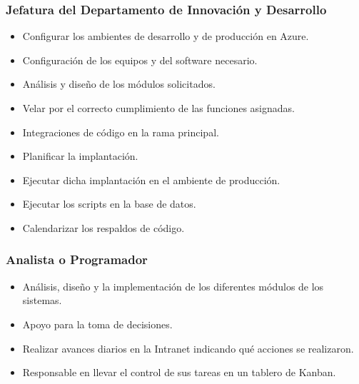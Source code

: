 \documentclass[conference]{IEEEtran}
\begin{document}
    \subsubsection{ \textbf{Jefatura del Departamento de Innovación y Desarrollo}}
    \hbox{}
        \begin{itemize}
        \item Configurar los ambientes de desarrollo y de producción en Azure.
        \item Configuración de los equipos y del software necesario.
        \item Análisis y diseño de los módulos solicitados.
        \item Velar por el correcto cumplimiento de las funciones asignadas.
        \item Integraciones de código en la rama principal.
        \item Planificar la implantación.
        \item Ejecutar dicha implantación en el ambiente de producción.
        \item Ejecutar los scripts en la base de datos.
        \item Calendarizar los respaldos de código.
        \end{itemize}
    \hbox{}
    \subsubsection{ \textbf{Analista o Programador}}
    \hbox{}
        \begin{itemize}
        \item Análisis, diseño y la implementación de los diferentes módulos de los sistemas.
        \item Apoyo para la toma de decisiones.
        \item Realizar avances diarios en la Intranet indicando qué acciones se realizaron.
        \item Responsable en llevar el control de sus tareas en un tablero de Kanban.
        \end{itemize}
    \hbox{}
\end{document}
